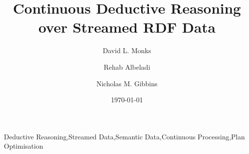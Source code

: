 \begin{frontmatter}
	\title{Continuous Deductive Reasoning over Streamed RDF Data}

	\author{David L. Monks}
	\author{Rehab Albeladi}
	\author{Nicholas M. Gibbins}
	\address{
	          Department of Electronics and Computer Science,\\
	          Faculty of Physical Sciences and Engineering,\\
	          University of Southampton,\\
	          University Rd., Southampton, SO17 1BJ,\\
	          United Kingdom
	}

	\begin{abstract}
		
	\end{abstract}

	\begin{keyword}
	      Deductive Reasoning\sep Streamed Data\sep Semantic Data\sep Continuous Processing\sep Plan Optimisation
	\end{keyword}

	\date{\today}

\end{frontmatter}